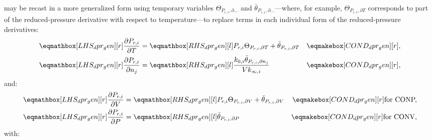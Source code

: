 \documentclass[12pt]{article}
\newcommand{\conp}{CONP}
\newcommand{\conv}{CONV}
\newcommand{\dconp}{\ifmmode\text{for \conp,}\else for \conp,\fi}
\newcommand{\dconv}{\ifmmode\text{for \conv,}\else for \conv.\fi}
\begin{document}
 may be recast in a more generalized form using temporary variables $\Theta_{P_{r, i}, \partial \ldots}$ and $\bar{\theta}_{P_{r, i}, \partial \ldots}$---where, for example, $\Theta_{P_{r,i}, \partial T}$ corresponds to part of the reduced-pressure derivative with respect to temperature---to replace terms in each individual form of the reduced-pressure derivatives:
\begin{align}
 \lhs{dpr_gen}{\frac{\partial P_{r, i} }{\partial T } } &= \rhs{dpr_gen}{P_{r, i} \Theta_{P_{r,i}, \partial T} + \bar{\theta}_{P_{r, i}, \partial T}} & \cond{dpr_gen}{,} \label{e:dpr_dt} \\
 \lhs{dpr_gen}{\frac{\partial P_{r, i} }{\partial n_j}} &= \rhs{dpr_gen}{\frac{k_{0, i}\bar{\theta}_{P_{r, i}, \partial n_j}}{V k_{\infty, i}}} & \cond{dpr_gen}{,} \label{e:dpr_dnj}
\end{align}
and:
\begin{subequations}
 \label{e:dpr_de}
 \begin{align}
  \lhs{dpr_gen}{\frac{\partial P_{r, i} }{\partial V}} &= \rhs{dpr_gen}{P_{r, i} \Theta_{P_{r,i}, \partial V} + \bar{\theta}_{P_{r, i}, \partial V}} & \cond{dpr_gen}{\dconp} \\
  \lhs{dpr_gen}{\frac{\partial P_{r, i} }{\partial P}} &= \rhs{dpr_gen}{\bar{\theta}_{P_{r, i}, \partial P}} & \cond{dpr_gen}{\dconv}
 \end{align}
\end{subequations}
with:
\end{document}
